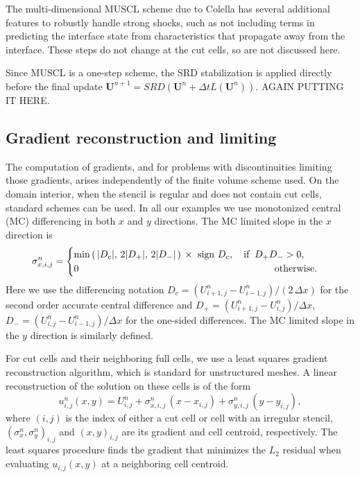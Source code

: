 The multi-dimensional MUSCL scheme due to Colella has several additional
features to robustly handle strong shocks, such as not including terms in
predicting the interface state from characteristics that propagate 
away from the interface. These
steps do not change at the cut cells, so are not discussed here.  

Since MUSCL is a one-step scheme, the SRD stabilization is applied directly
before the final update
$\mathbf{U}^{n+1} = SRD(\mathbf{U}^{n} + \Delta t L(\mathbf{U}^{n}))$.
AGAIN PUTTING IT HERE.



\subsection{Gradient reconstruction and limiting }\label{sec:limit}

The computation of gradients, and for problems with discontinuities limiting
those gradients, arises independently of the finite volume scheme used. 
On the domain interior, when the stencil is regular and does not contain cut cells, standard schemes can be used.
In all our examples we use monotonized central (MC) differencing in both $x$ and $y$ directions.  The MC limited slope in the $x$ direction is
\begin{equation}
\sigma^n_{x,i,j} =  \begin{cases} 
\min \left ( \,  \lvert{ D_c}\rvert,\,
2 \lvert {D_+}\rvert,\,
2 \lvert{D_-}\rvert \,  \right ) \,\times 
\text{ sign } D_c, \quad \text{if} \;\;  D_+ D_- >  0,\\
0 \hspace*{2.8in} \text{otherwise}.
\end{cases}
\end{equation}
Here we use the differencing notation
$D_c = (U^n_{i+1,j}-U^n_{i-1,j})/(2 \, \Delta x)$ for the second order accurate central difference and
$D_+ = (U^n_{i+1,j}-U^n_{i,j})/\Delta x$,
$D_- = (U^n_{i,j}-U^n_{i-1,j})/\Delta x$ for the one-sided differences.  The MC limited slope in the $y$ direction is similarly defined.

For cut cells and their neighboring full cells, we use a least squares gradient reconstruction algorithm, which is standard for unstructured meshes.
A linear reconstruction of the solution on these cells is of the form
\begin{equation}
u^n_{i,j}(x,y) = U_{i,j}^n + \sigma^n_{x,i,j} \,(x-x_{i,j}) +
                     \sigma^n_{y,i,j}\,(y-y_{i,j}),
\label{eqn:lls}
\end{equation}
where $(i,j)$ is the index of either a cut cell or cell with an irregular stencil, $(\sigma^n_{x},\sigma^n_{y})_{i,j}$ and $(x,y)_{i,j}$ are its gradient and cell centroid, respectively. The least squares procedure finds the gradient that minimizes the $L_2$ residual when evaluating  $u_{i,j}(x,y)$ at a neighboring cell centroid. 

